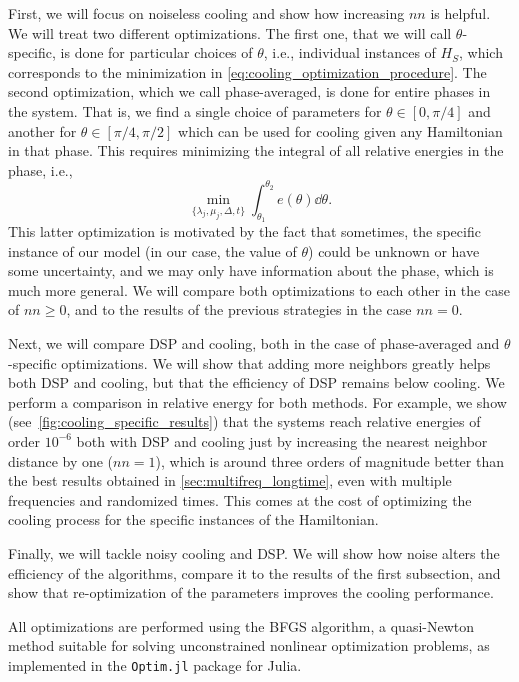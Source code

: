 \documentclass[aps,prx,twocolumn,superscriptaddress,nofootinbib,nolongbibliography,nobalancelastpage,10pt,floatfix]{revtex4-2}
\begin{document}
First, we will focus on noiseless cooling and show how increasing $nn$ is helpful. We will treat two different optimizations. The first one, that we will call $\theta$-specific, is done for particular choices of $\theta$, i.e., individual instances of $H_S$, which corresponds to the minimization in \cref{eq:cooling_optimization_procedure}. The second optimization, which we call phase-averaged, is done for entire phases in the system. That is, we find a single choice of parameters for $\theta \in [0, \pi/4]$ and another for $\theta \in [\pi/4, \pi/2]$ which can be used for cooling given any Hamiltonian in that phase. This requires minimizing the integral of all relative energies in the phase, i.e.,
\begin{equation}
    \min_{\{\lambda_j, \mu_j, \Delta, t\}} \int_{\theta_1}^{\theta_2} e(\theta)\dd\theta.
    \label{eq:average_cooling_optimization_procedure}
\end{equation}
This latter optimization is motivated by the fact that sometimes, the specific instance of our model (in our case, the value of $\theta$) could be unknown or have some uncertainty, and we may only have information about the phase, which is much more general. We will compare both optimizations to each other in the case of $nn \ge 0$, and to the results of the previous strategies in the case $nn=0$.

Next, we will compare DSP and cooling, both in the case of phase-averaged and $\theta$-specific optimizations. We will show that adding more neighbors greatly helps both DSP and cooling, but that the efficiency of DSP remains below cooling. We perform a comparison in relative energy for both methods. For example, we show (see~\cref{fig:cooling_specific_results}) that the systems reach relative energies of order $10^{-6}$ both with DSP and cooling just by increasing the nearest neighbor distance by one ($nn=1$), which is around three orders of magnitude better than the best results obtained in \cref{sec:multifreq_longtime}, even with multiple frequencies and randomized times. This comes at the cost of optimizing the cooling process for the specific instances of the Hamiltonian.

Finally, we will tackle noisy cooling and DSP. We will show how noise alters the efficiency of the algorithms, compare it to the results of the first subsection, and show that re-optimization of the parameters improves the cooling performance.

All optimizations are performed using the BFGS algorithm, a quasi-Newton method suitable for solving unconstrained nonlinear optimization problems, as implemented in the \texttt{Optim.jl} package for Julia.
\end{document}
